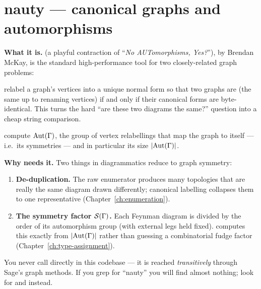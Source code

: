 \section{nauty --- canonical graphs and automorphisms}
\textbf{What it is.}   (a playful contraction of ``\emph{No
AUTomorphisms, Yes?}''), by Brendan McKay, is the standard high-performance tool
for two closely-related graph problems:
\begin{description}[leftmargin=1.2em]
  \item[Canonical labelling] relabel a graph's vertices into a unique normal
        form so that two graphs are  (the same up to renaming
        vertices) if and only if their canonical forms are byte-identical.  This
        turns the hard ``are these two diagrams the same?'' question into a
        cheap string comparison.
  \item[Automorphism group] compute $\mathrm{Aut}(\Gamma)$, the group of vertex
        relabellings that map the graph to itself --- i.e.\ its symmetries ---
        and in particular its size $|\mathrm{Aut}(\Gamma)|$.
\end{description}

\textbf{Why \Daedalus{} needs it.}  Two things in diagrammatics reduce to graph
symmetry:
\begin{enumerate}
  \item \textbf{De-duplication.}  The raw enumerator produces many topologies
        that are really the same diagram drawn differently; canonical labelling
        collapses them to one representative (Chapter~\ref{ch:enumeration}).
  \item \textbf{The symmetry factor $\mathcal{S}(\Gamma)$.}  Each Feynman diagram is
        divided by the order of its automorphism group (with external legs held
        fixed).  \Daedalus{} computes this exactly from
        $|\mathrm{Aut}(\Gamma)|$ rather than guessing a combinatorial fudge factor
        (Chapter~\ref{ch:type-assignment}).
\end{enumerate}

\begin{gotcha}
You never call  directly in this codebase --- it is reached
\emph{transitively} through Sage's graph methods.  If you grep for ``nauty'' you
will find almost nothing; look for  and
 instead.
\end{gotcha}

